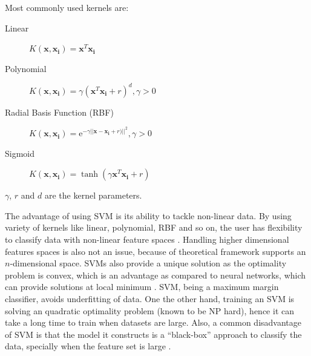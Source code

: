 Most commonly used kernels are:
\begin{description}
  \item[Linear] $K(\boldsymbol{x},\boldsymbol{x_i}) = \boldsymbol{x}^T\boldsymbol{x_i}$
  \item[Polynomial] $K(\boldsymbol{x},\boldsymbol{x_i}) = \gamma(\boldsymbol{x}^T\boldsymbol{x_i}+r)^d, \gamma > 0$
  \item[Radial Basis Function (RBF)] $K(\boldsymbol{x},\boldsymbol{x_i}) = \mathrm{e}^{-\gamma||\boldsymbol{x}-\boldsymbol{x_i}+r)||^2}, \gamma > 0$
  \item[Sigmoid] $K(\boldsymbol{x},\boldsymbol{x_i}) = \tanh(\gamma\boldsymbol{x}^T\boldsymbol{x_i}+r)$
\end{description}

$\gamma$, $r$ and $d$ are the kernel parameters.

The advantage of using SVM is its ability to tackle non-linear data. By using variety of kernels like linear, polynomial, RBF and so on, the user has flexibility to classify data with non-linear feature spaces \cite {Chang2011}. Handling higher dimensional features spaces is also not an issue, because of theoretical framework \cite{Vapnik1995} supports an $n$-dimensional space. SVMs also provide a unique solution as the optimality problem is convex, which is an advantage as compared to neural networks, which can provide solutions at local minimum \cite{Auria2008}. SVM, being a maximum margin classifier, avoids underfitting of data. One the other hand, training an SVM is solving an quadratic optimality problem (known to be NP hard), hence it can take a long time to train when datasets are large. Also, a common disadvantage of SVM is that the model it constructs is a \enquote{black-box} approach to classify the data, specially when the feature set is large \cite{Auria2008}.

